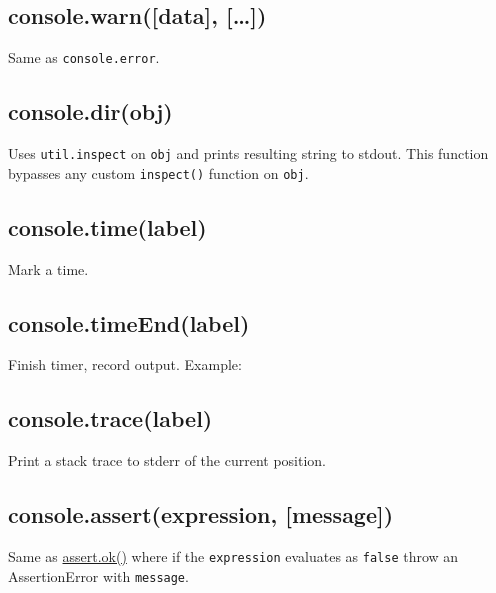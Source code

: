 \subsection{console.warn({[}data{]}, {[}\ldots{}{]})}

Same as \texttt{console.error}.

\subsection{console.dir(obj)}

Uses \texttt{util.inspect} on \texttt{obj} and prints resulting string
to stdout. This function bypasses any custom \texttt{inspect()} function
on \texttt{obj}.

\subsection{console.time(label)}

Mark a time.

\subsection{console.timeEnd(label)}

Finish timer, record output. Example:

\begin{Shaded}
\begin{Highlighting}[]
\NormalTok{(}\NormalTok{);}
 \NormalTok{(} 
  \NormalTok{;}
\NormalTok{\}}
\NormalTok{(}\NormalTok{);}
\end{Highlighting}
\end{Shaded}

\subsection{console.trace(label)}

Print a stack trace to stderr of the current position.

\subsection{console.assert(expression, {[}message{]})}

Same as
\href{assert.html\#assert\_assert\_value\_message\_assert\_ok\_value\_message}{assert.ok()}
where if the \texttt{expression} evaluates as \texttt{false} throw an
AssertionError with \texttt{message}.

